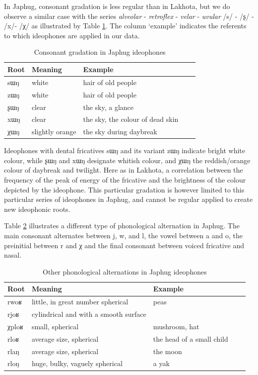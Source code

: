 \documentclass[oldfontcommands,oneside,a4paper,11pt]{article}
\newcommand{\ipa}[1]{{\phon \mbox{#1}}} %
\begin{document}
In Japhug,  consonant gradation is less regular than in Lakhota, but we do observe a similar case with the  series \textit{alveolar} - \textit{retroflex} - \textit{velar} - \textit{uvular} /\ipa{s}/ - /\ipa{ʂ}/ - /\ipa{x}/- /\ipa{χ}/ as illustrated by Table \ref{tab:gradation.fric}. The column `example' indicates the referents to which   ideophones are applied in our data.


\begin{table}[h]
\caption{Consonant gradation in Japhug ideophones} \label{tab:gradation.fric} \centering 
\begin{tabular}{lllll}
\toprule
Root& Meaning & Example \\
\midrule
\ipa{sɯŋ}& white & hair of old people \\
\ipa{zɯŋ}&white & hair of old people \\
\ipa{ʂɯŋ}& clear& the sky, a glance\\
\ipa{xɯŋ}& clear& the sky,  the colour of dead skin\\
\ipa{χɯŋ}& slightly orange& the sky during daybreak\\
\bottomrule
\end{tabular}
\end{table}
Ideophones with dental fricatives  \ipa{sɯŋ} and its variant \ipa{zɯŋ} indicate bright white colour, while \ipa{ʂɯŋ} and \ipa{xɯŋ} designate whitish colour, and \ipa{χɯŋ} the reddish/orange colour of daybreak and twilight. Here as in Lakhota, a correlation between the frequency of the peak of energy of the fricative and the brightness of the colour depicted by the ideophone. This particular gradation is however limited to this particular series of ideophones in Japhug, and cannot be regular applied to create new ideophonic roots.

Table \ref{tab:gradation.lateral}  illustrates a different type of phonological alternation in Japhug.   The main consonant alternates between \ipa{j}, \ipa{w}, and \ipa{l},  the vowel between \ipa{a} and \ipa{o}, the preinitial between \ipa{r} and \ipa{χ} and the final consonant between voiced fricative and nasal.

\begin{table}[h]
\caption{Other phonological alternations in Japhug ideophones} \label{tab:gradation.lateral} \centering 
\begin{tabular}{lllll}
\toprule
Root& Meaning & Example \\
\midrule
\ipa{rwoʁ}& little, in great number spherical& peas \\
\ipa{rjoʁ}&cylindrical and with a smooth surface& \\
\ipa{χploʁ}& small, spherical& mushroom, hat\\
\ipa{rloʁ}& average size, spherical& the head of a small child\\
\ipa{rlaŋ}& average size, spherical& the moon\\
\ipa{rloŋ}& huge, bulky, vaguely spherical&a yak\\
\bottomrule
\end{tabular}
\end{table}
\end{document}
